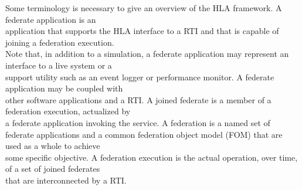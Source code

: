 Some terminology is necessary to give an overview of the HLA framework. A federate application is an\\
application that supports the HLA interface to a RTI and that is capable of joining a federation execution.\\
Note that, in addition to a simulation, a federate application may represent an interface to a live system or a\\
support utility such as an event logger or performance monitor. A federate application may be coupled with\\
other software applications and a RTI. A joined federate is a member of a federation execution, actualized by\\
a federate application invoking the  service. A federation is a named set of\\
federate applications and a common federation object model (FOM) that are used as a whole to achieve\\
some specific objective. A federation execution is the actual operation, over time, of a set of joined federates\\
that are interconnected by a RTI.

\vspace{8.2pt}

\newpage


